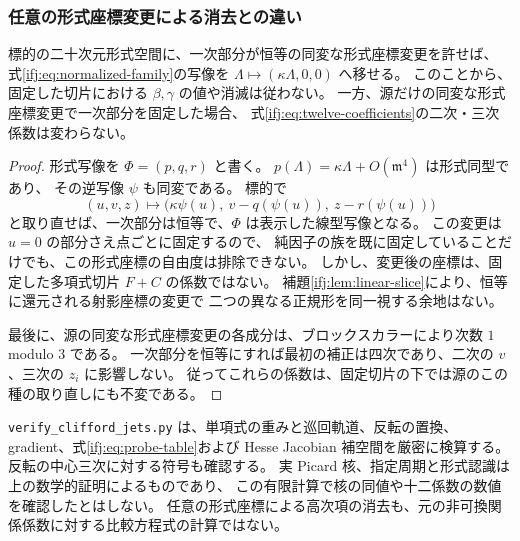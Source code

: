 \subsubsection{任意の形式座標変更による消去との違い}

\begin{proposition}[自由な標的座標では全ての高次項を消去できる]
\label{ifj:prop:formal-straightening}
標的の二十次元形式空間に、一次部分が恒等の同変な形式座標変更を許せば、
式\eqref{ifj:eq:normalized-family}の写像を
$\Lambda\mapsto(\kappa\Lambda,0,0)$ へ移せる。
このことから、固定した切片における $\beta,\gamma$ の値や消滅は従わない。
一方、源だけの同変な形式座標変更で一次部分を固定した場合、
式\eqref{ifj:eq:twelve-coefficients}の二次・三次係数は変わらない。
\end{proposition}

\begin{proof}
形式写像を $\Phi=(p,q,r)$ と書く。
$p(\Lambda)=\kappa\Lambda+O(\mathfrak m^4)$ は形式同型であり、
その逆写像 $\psi$ も同変である。
標的で
\[
 (u,v,z)\longmapsto
       \bigl(\kappa\psi(u),\ v-q(\psi(u)),\ z-r(\psi(u))\bigr)
\]
と取り直せば、一次部分は恒等で、$\Phi$ は表示した線型写像となる。
この変更は $u=0$ の部分さえ点ごとに固定するので、
純因子の族を既に固定していることだけでも、この形式座標の自由度は排除できない。
しかし、変更後の座標は、固定した多項式切片 $F+C$ の係数ではない。
補題\ref{ifj:lem:linear-slice}により、恒等に還元される射影座標の変更で
二つの異なる正規形を同一視する余地はない。

最後に、源の同変な形式座標変更の各成分は、ブロックスカラーにより次数
$1$ modulo $3$ である。
一次部分を恒等にすれば最初の補正は四次であり、二次の $v$、三次の $z_i$ に影響しない。
従ってこれらの係数は、固定切片の下では源のこの種の取り直しにも不変である。
\end{proof}

\begin{remark}
\label{ifj:rem:scope}
\texttt{verify\_clifford\_jets.py} は、単項式の重みと巡回軌道、反転の置換、
gradient、式\eqref{ifj:eq:probe-table}および Hesse Jacobian 補空間を厳密に検算する。
反転の中心三次に対する符号も確認する。
実 Picard 核、指定周期と形式認識は上の数学的証明によるものであり、
この有限計算で核の同値や十二係数の数値を確認したとはしない。
任意の形式座標による高次項の消去も、元の非可換関係係数に対する比較方程式の計算ではない。
\end{remark}
